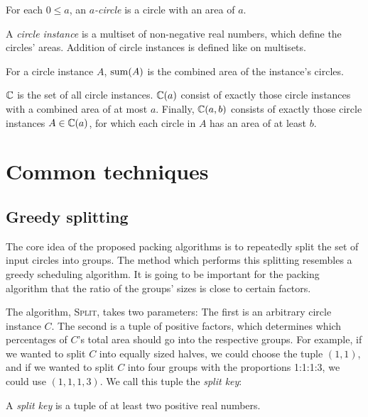 \documentclass[%
    a4paper,              %
    style=screen,          %
    bibliography=totoc,   %
    nexus,                %
    lnum,                 %
    extramargin,          %
]{tubsbook}
\begin{document}
\begin{definition}
    For each $0 \le a$, an \emph{$a$-circle} is a circle with an area of $a$.
\end{definition}

\begin{definition}
    A \emph{circle instance} is a multiset of non-negative real numbers, which define the circles' areas. Addition of circle instances is defined like on multisets.
\end{definition}

\begin{definition}
    For a circle instance $A$, $\operatorname{sum}(A)$ is the combined area of the instance's circles.
\end{definition}

\begin{definition}
    $\mathbb{C}$ is the set of all circle instances. $\mathbb{C}(a)$ consist of exactly those circle instances with a combined area of at most $a$. Finally, $\mathbb{C}(a,b)$ consists of exactly those circle instances $A \in \mathbb{C}(a)$, for which each circle in $A$ has an area of at least $b$.
\end{definition}

\chapter{Common techniques}

\section{Greedy splitting}

The core idea of the proposed packing algorithms is to repeatedly split the set of input circles into groups. The method which performs this splitting resembles a greedy scheduling algorithm. It is going to be important for the packing algorithm that the ratio of the groups' sizes is close to certain factors.

The algorithm, \textsc{Split}, takes two parameters: The first is an arbitrary circle instance $C$. The second is a tuple of positive factors, which determines which percentages of $C$'s total area should go into the respective groups. For example, if we wanted to split $C$ into equally sized halves, we could choose the tuple $(1,1)$, and if we wanted to split $C$ into four groups with the proportions 1:1:1:3, we could use $(1,1,1,3)$. We call this tuple the \emph{split key}:

\begin{definition}
    A \emph{split key} is a tuple of at least two positive real numbers.
\end{definition}
\end{document}
